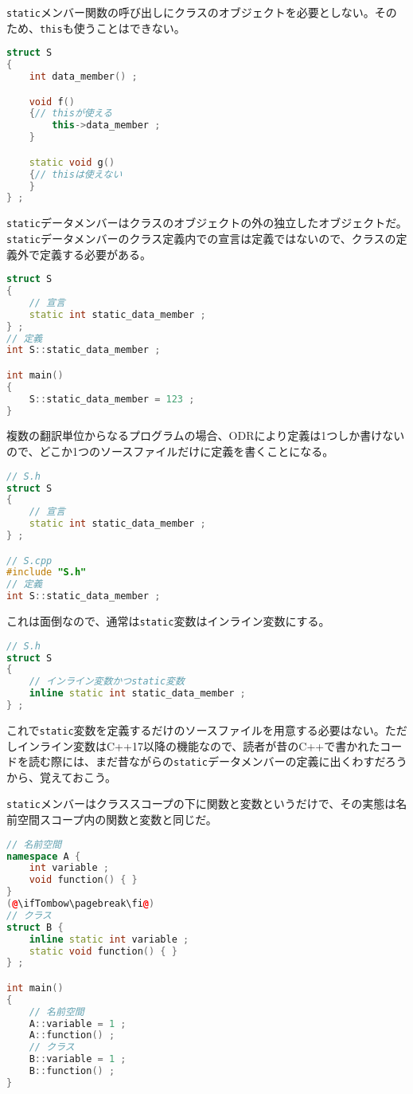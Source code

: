 \texttt{static}メンバー関数の呼び出しにクラスのオブジェクトを必要としない。そのため、\texttt{this}も使うことはできない。

\begin{lstlisting}[language={C++}]
struct S
{
    int data_member() ;

    void f()
    {// thisが使える
        this->data_member ;
    }

    static void g()
    {// thisは使えない
    }
} ;
\end{lstlisting}

\texttt{static}データメンバーはクラスのオブジェクトの外の独立したオブジェクトだ。\texttt{static}データメンバーのクラス定義内での宣言は定義ではないので、クラスの定義外で定義する必要がある。

\begin{lstlisting}[language={C++}]
struct S
{
    // 宣言
    static int static_data_member ;
} ;
// 定義
int S::static_data_member ;

int main()
{
    S::static_data_member = 123 ;
}
\end{lstlisting}

複数の翻訳単位からなるプログラムの場合、ODRにより定義は1つしか書けないので、どこか1つのソースファイルだけに定義を書くことになる。

\begin{lstlisting}[language={C++}]
// S.h
struct S
{
    // 宣言
    static int static_data_member ;
} ;

// S.cpp
#include "S.h"
// 定義
int S::static_data_member ;
\end{lstlisting}

これは面倒なので、通常は\texttt{static}変数はインライン変数にする。

\begin{lstlisting}[language={C++}]
// S.h
struct S
{
    // インライン変数かつstatic変数
    inline static int static_data_member ;
} ;
\end{lstlisting}

これで\texttt{static}変数を定義するだけのソースファイルを用意する必要はない。ただしインライン変数はC++17以降の機能なので、読者が昔のC++で書かれたコードを読む際には、まだ昔ながらの\texttt{static}データメンバーの定義に出くわすだろうから、覚えておこう。

\texttt{static}メンバーはクラススコープの下に関数と変数というだけで、その実態は名前空間スコープ内の関数と変数と同じだ。

\begin{lstlisting}[language={C++}]
// 名前空間
namespace A {
    int variable ;
    void function() { }
}
(@\ifTombow\pagebreak\fi@)
// クラス
struct B {
    inline static int variable ;
    static void function() { }
} ;

int main()
{
    // 名前空間
    A::variable = 1 ;
    A::function() ;
    // クラス
    B::variable = 1 ;
    B::function() ;
}
\end{lstlisting}

